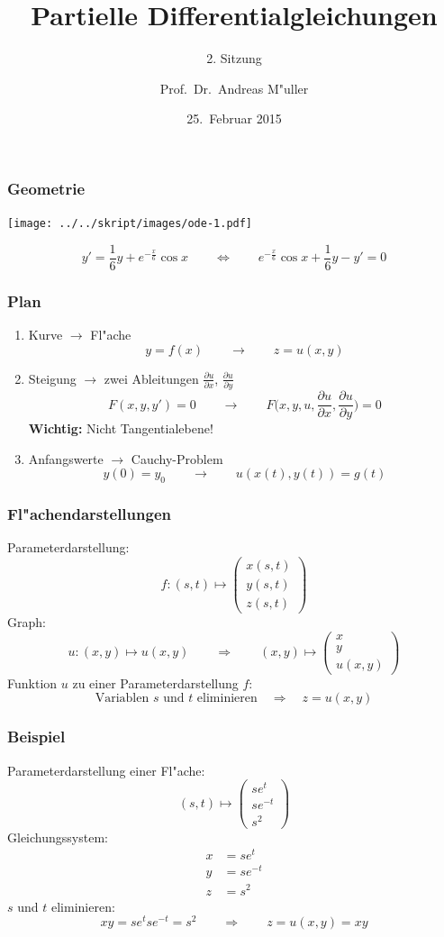 \documentclass{beamer}
\title[]{Partielle Differentialgleichungen}
\subtitle{2. Sitzung}
\date[25.~Februar 2015]{25.~Februar 2015}
\author{Prof.~Dr.~Andreas M"uller}
\begin{document}
\begin{frame}
\titlepage
\end{frame}

\begin{frame}
\frametitle{Geometrie}
\begin{center}
\texttt{[image: ../../skript/images/ode-1.pdf]}
\end{center}
\[
y'=\frac16y+e^{-\frac{x}6}\cos x
\qquad\Leftrightarrow\qquad
e^{-\frac{x}6}\cos x
+
\frac16y
-
y'
=0
\]
\end{frame}

\begin{frame}
\frametitle{Plan}
\begin{enumerate}
\item Kurve
\pause
$\to$ Fl"ache
\[
y = f(x)
\qquad\to \qquad
z = u(x,y)
\]
\pause
\item Steigung
\pause
$\to$ zwei Ableitungen
$\displaystyle\frac{\partial u}{\partial x}$,
$\displaystyle\frac{\partial u}{\partial y}$
\[
F(x,y,y')=0
\qquad\to \qquad
F\biggl(x,y,u,\frac{\partial u}{\partial x},\frac{\partial u}{\partial y}
\biggr)=0
\]
\pause
{\bf Wichtig:} Nicht Tangentialebene!
\pause
\item Anfangswerte
\pause
$\to$ Cauchy-Problem
\[
y(0)=y_0
\qquad\to \qquad
u(x(t),y(t)) = g(t)
\]
\end{enumerate}
\end{frame}

\begin{frame}
\frametitle{Fl"achendarstellungen}
Parameterdarstellung:
\pause
\[
f\colon (s,t)\mapsto\begin{pmatrix}
x(s,t)\\y(s,t)\\z(s,t)
\end{pmatrix}
\]
\pause
Graph:
\pause
\[
u\colon (x,y)\mapsto u(x,y)
\qquad\Rightarrow\qquad
(x,y)\mapsto\begin{pmatrix}
x\\y\\u(x,y)
\end{pmatrix}
\]
\pause
Funktion $u$ zu einer Parameterdarstellung $f$:
\pause
\[
\text{Variablen $s$ und $t$ eliminieren}\quad\Rightarrow\quad
z=u(x,y)
\]
\end{frame}

\begin{frame}
\frametitle{Beispiel}
Parameterdarstellung einer Fl"ache:
\[
(s,t)\mapsto\begin{pmatrix}
se^t\\se^{-t}\\s^2
\end{pmatrix}
\]
Gleichungssystem:
\begin{align*}
x&=se^t\\
y&=se^{-t}\\
z&=s^2
\end{align*}
$s$ und $t$ eliminieren:
\[
xy=se^tse^{-t}=s^2
\qquad\Rightarrow\qquad
z=u(x,y)=xy
\]
\end{frame}
\end{document}
